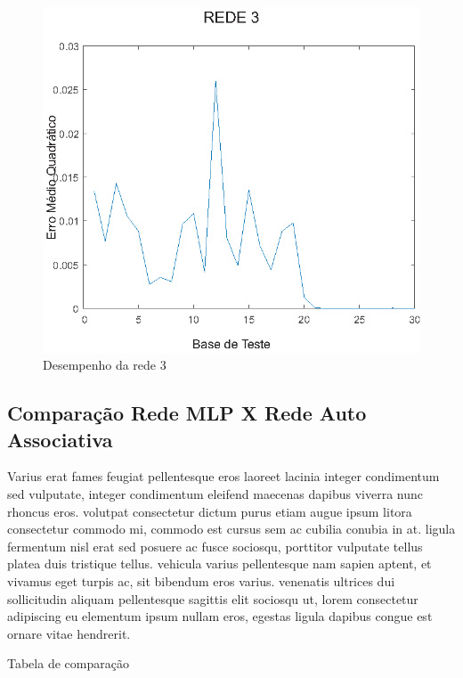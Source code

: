 \begin{figure}[H]

\centering %
\includegraphics{04-Figuras/MSE_DesempenhoNet3}

\caption{Desempenho da rede 3}

\label{figura:rede3}

\end{figure}



\subsection{Comparação Rede MLP X Rede Auto Associativa}

Varius erat fames feugiat pellentesque eros laoreet lacinia integer condimentum sed vulputate, integer condimentum eleifend maecenas dapibus viverra nunc rhoncus eros. volutpat consectetur dictum purus etiam augue ipsum litora consectetur commodo mi, commodo est cursus sem ac cubilia conubia in at. ligula fermentum nisl erat sed posuere ac fusce sociosqu, porttitor vulputate tellus platea duis tristique tellus. vehicula varius pellentesque nam sapien aptent, et vivamus eget turpis ac, sit bibendum eros varius. venenatis ultrices dui sollicitudin aliquam pellentesque sagittis elit sociosqu ut, lorem consectetur adipiscing eu elementum ipsum nullam eros, egestas ligula dapibus congue est ornare vitae hendrerit.

Tabela de comparação